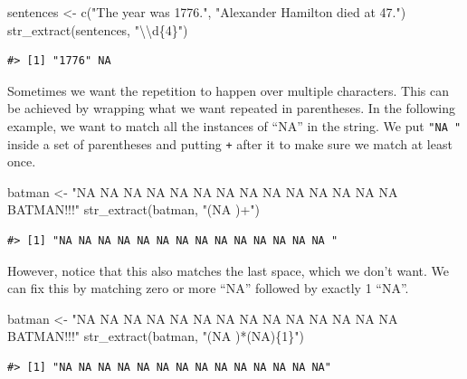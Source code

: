 \documentclass[
]{krantz}
\makeatletter
\newenvironment{Shaded}{\begin{snugshade}}{\end{snugshade}}
\newcommand{\FunctionTok}[1]{\textcolor[rgb]{0.00,0.00,0.00}{#1}}
\newcommand{\NormalTok}[1]{#1}
\newcommand{\OtherTok}[1]{\textcolor[rgb]{0.56,0.35,0.01}{#1}}
\newcommand{\SpecialCharTok}[1]{\textcolor[rgb]{0.00,0.00,0.00}{#1}}
\newcommand{\StringTok}[1]{\textcolor[rgb]{0.31,0.60,0.02}{#1}}
\newenvironment{kframe}{%
\medskip{}
\setlength{\fboxsep}{.8em}
 \def\at@end@of@kframe{}%
 \ifinner\ifhmode%
  \def\at@end@of@kframe{\end{minipage}}%
  \begin{minipage}{\columnwidth}%
 \fi\fi%
 \def\FrameCommand##1{\hskip\@totalleftmargin \hskip-\fboxsep
 \colorbox{shadecolor}{##1}\hskip-\fboxsep
     \hskip-\linewidth \hskip-\@totalleftmargin \hskip\columnwidth}%
 \MakeFramed {\advance\hsize-\width
   \@totalleftmargin\z@ \linewidth\hsize
   \@setminipage}}%
 {\par\unskip\endMakeFramed%
 \at@end@of@kframe}
\renewenvironment{Shaded}{\begin{kframe}}{\end{kframe}}
\makeatother
\begin{document}
\begin{Shaded}
\begin{Highlighting}[]
\NormalTok{sentences }\OtherTok{\textless{}{-}} \FunctionTok{c}\NormalTok{(}\StringTok{"The year was 1776."}\NormalTok{, }\StringTok{"Alexander Hamilton died at 47."}\NormalTok{)}
\FunctionTok{str\_extract}\NormalTok{(sentences, }\StringTok{"}\SpecialCharTok{\textbackslash{}\textbackslash{}}\StringTok{d\{4\}"}\NormalTok{)}
\end{Highlighting}
\end{Shaded}

\begin{verbatim}
#> [1] "1776" NA
\end{verbatim}

Sometimes we want the repetition to happen over multiple characters. This can be achieved by wrapping what we want repeated in parentheses. In the following example, we want to match all the instances of ``NA'' in the string. We put \texttt{"NA\ "} inside a set of parentheses and putting \texttt{+} after it to make sure we match at least once.

\begin{Shaded}
\begin{Highlighting}[]
\NormalTok{batman }\OtherTok{\textless{}{-}} \StringTok{"NA NA NA NA NA NA NA NA NA NA NA NA NA NA BATMAN!!!"}
\FunctionTok{str\_extract}\NormalTok{(batman, }\StringTok{"(NA )+"}\NormalTok{)}
\end{Highlighting}
\end{Shaded}

\begin{verbatim}
#> [1] "NA NA NA NA NA NA NA NA NA NA NA NA NA NA "
\end{verbatim}

However, notice that this also matches the last space, which we don't want. We can fix this by matching zero or more ``NA'' followed by exactly 1 ``NA''.

\begin{Shaded}
\begin{Highlighting}[]
\NormalTok{batman }\OtherTok{\textless{}{-}} \StringTok{"NA NA NA NA NA NA NA NA NA NA NA NA NA NA BATMAN!!!"}
\FunctionTok{str\_extract}\NormalTok{(batman, }\StringTok{"(NA )*(NA)\{1\}"}\NormalTok{)}
\end{Highlighting}
\end{Shaded}

\begin{verbatim}
#> [1] "NA NA NA NA NA NA NA NA NA NA NA NA NA NA"
\end{verbatim}
\end{document}
